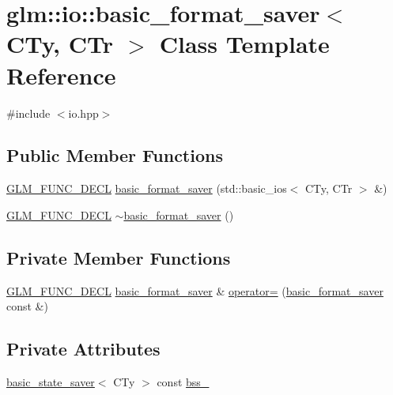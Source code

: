 \hypertarget{classglm_1_1io_1_1basic__format__saver}{}\section{glm\+:\+:io\+:\+:basic\+\_\+format\+\_\+saver$<$ C\+Ty, C\+Tr $>$ Class Template Reference}
\label{classglm_1_1io_1_1basic__format__saver}


{\ttfamily \#include $<$io.\+hpp$>$}

\subsection*{Public Member Functions}
\begin{DoxyCompactItemize}
\item 
\mbox{\hyperlink{setup_8hpp_ab2d052de21a70539923e9bcbf6e83a51}{G\+L\+M\+\_\+\+F\+U\+N\+C\+\_\+\+D\+E\+CL}} \mbox{\hyperlink{classglm_1_1io_1_1basic__format__saver_a9688fa6dce0c32285527df2336ca9127}{basic\+\_\+format\+\_\+saver}} (std\+::basic\+\_\+ios$<$ C\+Ty, C\+Tr $>$ \&)
\item 
\mbox{\hyperlink{setup_8hpp_ab2d052de21a70539923e9bcbf6e83a51}{G\+L\+M\+\_\+\+F\+U\+N\+C\+\_\+\+D\+E\+CL}} \mbox{\hyperlink{classglm_1_1io_1_1basic__format__saver_a49d58d91548a071d5f660c74ca88979b}{$\sim$basic\+\_\+format\+\_\+saver}} ()
\end{DoxyCompactItemize}
\subsection*{Private Member Functions}
\begin{DoxyCompactItemize}
\item 
\mbox{\hyperlink{setup_8hpp_ab2d052de21a70539923e9bcbf6e83a51}{G\+L\+M\+\_\+\+F\+U\+N\+C\+\_\+\+D\+E\+CL}} \mbox{\hyperlink{classglm_1_1io_1_1basic__format__saver}{basic\+\_\+format\+\_\+saver}} \& \mbox{\hyperlink{classglm_1_1io_1_1basic__format__saver_a3d4f0a9fd357a611f81b17443cf5276b}{operator=}} (\mbox{\hyperlink{classglm_1_1io_1_1basic__format__saver}{basic\+\_\+format\+\_\+saver}} const \&)
\end{DoxyCompactItemize}
\subsection*{Private Attributes}
\begin{DoxyCompactItemize}
\item 
\mbox{\hyperlink{classglm_1_1io_1_1basic__state__saver}{basic\+\_\+state\+\_\+saver}}$<$ C\+Ty $>$ const \mbox{\hyperlink{classglm_1_1io_1_1basic__format__saver_a5d2b333a0879f294698c266fa4a7792b}{bss\+\_\+}}
\end{DoxyCompactItemize}


